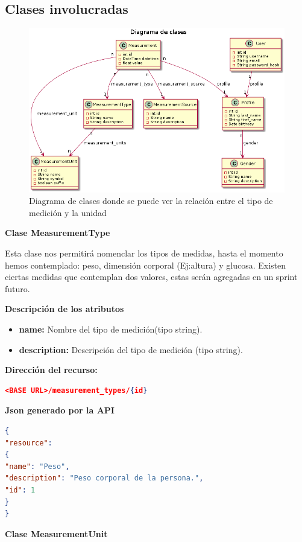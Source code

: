 \subsection{Clases involucradas}
\label{3-clases_involucradas}
\begin{figure}[h!]
	\centering
	\includegraphics[width=.8\textwidth]{img/3-diagramaClases_relacionTipos}
	\caption{Diagrama de clases donde se puede ver la relación entre el tipo de medición y la unidad}
	\label{relacion_tipo}
\end{figure}


\textbf{ Clase MeasurementType }

Esta clase nos permitirá  nomenclar  los tipos de medidas, hasta el momento hemos contemplado: peso, dimensión corporal (Ej:altura) y glucosa. Existen ciertas medidas que contemplan dos valores, estas serán agregadas en un sprint futuro.

\textbf{Descripción de los atributos}
\begin{itemize}
	\item \textbf{name: }	Nombre del tipo de medición(tipo string).
	\item \textbf{description:} Descripción del tipo de medición (tipo string).
\end{itemize}

\textbf{Dirección del recurso:}
\begin{lstlisting}[language=json,firstnumber=1]
<BASE URL>/measurement_types/{id}
\end{lstlisting}

\textbf{Json generado por la API} 
\begin{lstlisting}[language=json,firstnumber=1]
{
"resource": 
{
"name": "Peso",
"description": "Peso corporal de la persona.",
"id": 1
}
}
\end{lstlisting}

\textbf{ Clase MeasurementUnit }

